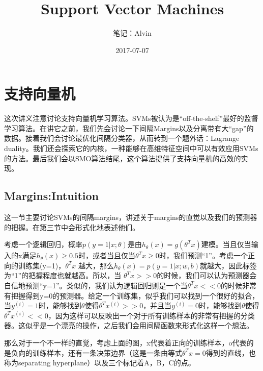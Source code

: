 \documentclass[UTF8]{ctexart}
\begin{document}
\title{Support Vector Machines}
\author{笔记：Alvin}
\date{2017-07-07}

\maketitle

\tableofcontents
\newpage

\section{支持向量机}

这次讲义注意讨论支持向量机学习算法。SVMs被认为是“off-the-shelf”最好的监督学习算法。在讲它之前，我们先会讨论一下间隔Margins以及分离带有大“gap”的数据。接着我们会讨论最优化间隔分类器，从而转到一个题外话：Lagrange duality。我们还会探索它的内核，一种能够在高维特征空间中可以有效应用SVMs的方法。最后我们会以SMO算法结尾，这个算法提供了支持向量机的高效的实现。

\subsection{Margins:Intuition}

这一节主要讨论SVMs的间隔margins，讲述关于margins的直觉以及我们的预测器的把握。在第三节中会形式化地表述他们。

考虑一个逻辑回归，概率$p(y=1|x;\theta)$是由$h_{\theta}(x)=g(\theta^{T}x)$建模。当且仅当输入的x满足$h_{\theta}(x) \geq 0.5$时，或者当且仅当$\theta^{T}x \geq 0 $时，我们预测“1”。考虑一个正向的训练集(y=1)，$\theta^{T}x$ 越大，那么$h_{\theta}(x)=p(y=1|x;w,b)$就越大，因此标签为“1”的把握程度也就越高。所以，当 $\theta^{T}x >> 0$的时候，我们可以认为预测器会自信地预测“y=1”。类似的，我们认为逻辑回归则是一个当$\theta^{T}x << 0$的时候非常有把握得到y=0的预测器。给定一个训练集，似乎我们可以找到一个很好的拟合，当$y^{(i)}=1$时，能够找到$\theta$使得$\theta^{T}x^{(i)}>>0$，并且当$y^{(i)}=0$时，能够找到$\theta$使得$\theta^{T}x^{(i)}<<0$，因为这样可以反映出一个对于所有训练样本的非常有把握的分类器。这似乎是一个漂亮的操作，之后我们会用间隔函数来形式化这样一个想法。

\begin{figure}[htb]        
\end{figure}

那么对于一个不一样的直觉，考虑上面的图，x代表着正向的训练样本，o代表的是负向的训练样本，还有一条决策边界（这是一条由等式$\theta^{T}x=0$得到的直线，也称为separating hyperplane）以及三个标记着A，B，C的点。
\end{document}

